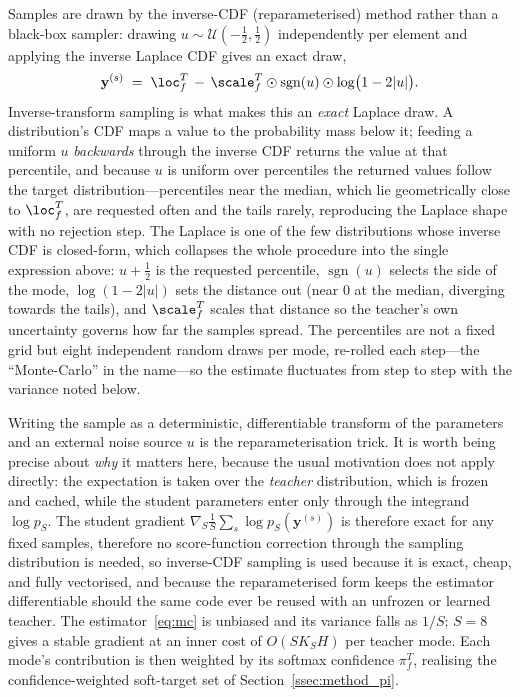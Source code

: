 Samples are drawn by the inverse-CDF (reparameterised) method rather than a
black-box sampler: drawing $u\sim\mathcal{U}(-\tfrac12,\tfrac12)$ independently per
element and applying the inverse Laplace CDF gives an exact draw,
\begin{equation}
  \label{eq:invcdf}
  \mathbf{y}^{(s)} \;=\; \loc^T_f \,-\, \scale^T_f \odot
    \operatorname{sgn}(u)\odot\log\!\big(1-2\lvert u\rvert\big).
\end{equation}
Inverse-transform sampling is what makes this an \emph{exact} Laplace draw. A
distribution's CDF maps a value to the probability mass below it; feeding a uniform
$u$ \emph{backwards} through the inverse CDF returns the value at that percentile,
and because $u$ is uniform over percentiles the returned values follow the target
distribution---percentiles near the median, which lie geometrically close to
$\loc^T_f$, are requested often and the tails rarely, reproducing the Laplace shape
with no rejection step. The Laplace is one of the few distributions whose inverse
CDF is closed-form, which collapses the whole procedure into the single expression
above: $u\!+\!\tfrac12$ is the requested percentile, $\operatorname{sgn}(u)$ selects
the side of the mode, $\log(1-2\lvert u\rvert)$ sets the distance out (near $0$ at
the median, diverging towards the tails), and $\scale^T_f$ scales that distance so
the teacher's own uncertainty governs how far the samples spread. The percentiles
are not a fixed grid but eight independent random draws per mode, re-rolled each
step---the ``Monte-Carlo'' in the name---so the estimate fluctuates from step to
step with the variance noted below.

Writing the sample as a deterministic, differentiable transform of the parameters
and an external noise source $u$ is the reparameterisation trick. It is worth being
precise about \emph{why} it matters here, because the usual motivation does not
apply directly: the expectation is taken over the \emph{teacher} distribution, which
is frozen and cached, while the student parameters enter only through the integrand
$\log p_S$. The student gradient $\nabla_S\frac1S\sum_s\log p_S(\mathbf{y}^{(s)})$ is
therefore exact for any fixed samples, therefore no score-function correction through the
sampling distribution is needed, so inverse-CDF sampling is used because it is
exact, cheap, and fully vectorised, and because the reparameterised form keeps the
estimator differentiable should the same code ever be reused with an unfrozen or
learned teacher. The estimator~\eqref{eq:mc} is unbiased and its variance falls as
$1/S$; $S{=}8$ gives a stable gradient at an inner cost of $O(S K_S H)$ per teacher
mode. Each mode's contribution is then weighted by its softmax confidence $\pi^T_f$,
realising the confidence-weighted soft-target set of
Section~\ref{ssec:method_pi}.

